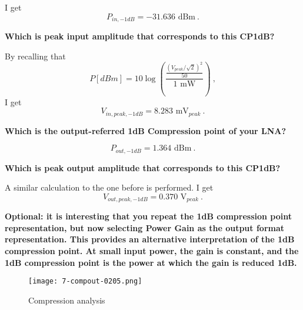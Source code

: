    \noindent I get
   \begin{equation}
      P_{in,-1dB} = -31.636 \text{ dBm} \ .
   \end{equation}


\begin{pexbox}{}
   \noindent \textbf{Which is peak input amplitude that corresponds to this CP1dB?}
\end{pexbox}

\noindent By recalling that 
\begin{equation}
   P [dBm] = 10 \log\left(\frac{\frac{(V_{peak}/\sqrt{2})^2}{50}}{1 \text{ mW}}\right) \ ,
\end{equation}
\noindent I get
\begin{equation}
   V_{in,peak,-1dB} = 8.283 \text{ mV}_{peak} \ .
\end{equation}

\begin{pexbox}{}
   \noindent \textbf{Which is the output-referred 1dB Compression point of your LNA?}
\end{pexbox}
%
   \begin{equation}
      P_{out,-1dB} = 1.364 \text{ dBm} \ .
   \end{equation}


\begin{pexbox}{}
   \noindent \textbf{Which is peak output amplitude that corresponds to this CP1dB?}
\end{pexbox}

   \noindent A similar calculation to the one before is performed. I get
   \begin{equation}
      V_{out,peak,-1dB} = 0.370 \text{ V}_{peak} \ .
   \end{equation}









\begin{pexbox}{}
   \noindent \textbf{Optional: it is interesting that you repeat the 1dB compression point representation, but now selecting Power Gain as the output format representation. This provides an alternative interpretation of the 1dB compression point. At small input power, the gain is constant, and the 1dB compression point is the power at which the gain is reduced 1dB.}
\end{pexbox}

\begin{figure} [H] \centering
   \texttt{[image: 7-compout-0205.png]}
   \caption{Compression analysis}
\end{figure}


